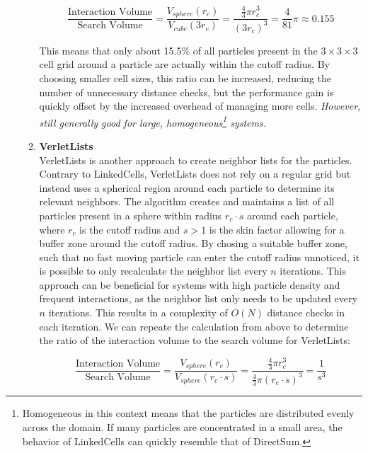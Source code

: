 \begin{enumerate}[label=\textbf{\arabic*.}]
\begin{enumerate}
                        \begin{equation}
                              \frac{\text{Interaction Volume}}{\text{Search Volume}} =
                              \frac{V_{sphere}(r_c)}{V_{cube}(3r_c)} = \frac{\frac{4}{3}\pi r_c^3}{(3r_c)^3} = \frac{4}{81}\pi \approx 0.155
                        \end{equation}

                        This means that only about 15.5\% of all particles present in the $3\times3\times3$ cell grid around a particle are actually within the cutoff radius. By choosing smaller cell sizes, this ratio can be increased, reducing the number of unnecessary distance checks, but the performance gain is quickly offset by the increased overhead of managing more cells. 
                        \textit{However, still generally good for large, homogeneous\footnote{Homogeneous in this context means that the particles are distributed evenly across the domain. If many particles are concentrated in a small area, the behavior of LinkedCells can quickly resemble that of DirectSum.} systems.}

                  \item \textbf{VerletLists} \\
                        VerletLists is another approach to create neighbor lists for the particles. Contrary to LinkedCells, VerletLists does not rely on a regular grid but instead uses a spherical region around each particle to determine its relevant neighbors.
                        The algorithm creates and maintains a list of all particles present in a sphere within radius $r_c \cdot s$ around each particle, where $r_c$ is the cutoff radius and $s>1$ is the skin factor allowing for a buffer zone around the cutoff radius.
                        By chosing a suitable buffer zone, such that no fast moving particle can enter the cutoff radius unnoticed, it is possible to only recalculate the neighbor list every $n$ iterations. This approach can be beneficial for systems with high particle density and frequent interactions, as the neighbor list only needs to be updated every $n$ iterations. This results in a complexity of $O(N)$ distance checks in each iteration.
                        We can repeate the calculation from above to determine the ratio of the interaction volume to the search volume for VerletLists:

                        \begin{equation}
                              \frac{\text{Interaction Volume}}{\text{Search Volume}} =
                              \frac{V_{sphere}(r_c)}{V_{sphere}(r_c \cdot s)} = \frac{\frac{4}{3}\pi r_c^3}{\frac{4}{3}\pi (r_c \cdot s)^3} = \frac{1}{s^3}
                        \end{equation}


\end{enumerate}
\end{enumerate}
